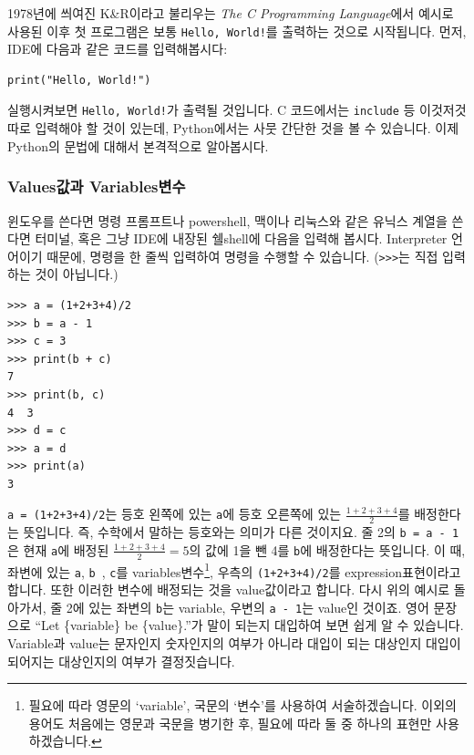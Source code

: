 \documentclass[../main.tex]{subfiles}
\begin{document}
1978년에 씌여진 K\&R이라고 불리우는 \textit{The C Programming Language}에서 예시로 사용된 이후 첫 프로그램은 보통 \texttt{Hello, World!}를 출력하는 것으로 시작됩니다.
먼저, IDE에 다음과 같은 코드를 입력해봅시다:
\begin{verbatim}
print("Hello, World!")
\end{verbatim}
실행시켜보면 \texttt{Hello, World!}가 출력될 것입니다.
C 코드에서는 \texttt{include} 등 이것저것 따로 입력해야 할 것이 있는데, Python에서는 사뭇 간단한 것을 볼 수 있습니다.
이제 Python의 문법에 대해서 본격적으로 알아봅시다.

\subsubsection{Values값과 Variables변수}
윈도우를 쓴다면 명령 프롬프트나 powershell, 맥이나 리눅스와 같은 유닉스 계열을 쓴다면 터미널, 혹은 그냥 IDE에 내장된 쉘shell에 다음을 입력해 봅시다.
Interpreter 언어이기 때문에, 명령을 한 줄씩 입력하여 명령을 수행할 수 있습니다.
(\texttt{>>>}는 직접 입력하는 것이 아닙니다.)
\begin{verbatim}
>>> a = (1+2+3+4)/2
>>> b = a - 1
>>> c = 3
>>> print(b + c)
7
>>> print(b, c)
4  3
>>> d = c
>>> a = d
>>> print(a)
3
\end{verbatim}
\texttt{a = (1+2+3+4)/2}는 등호 왼쪽에 있는 \texttt{a}에 등호 오른쪽에 있는 $\frac{1+2+3+4}{2}$를 배정한다는 뜻입니다.
즉, 수학에서 말하는 등호와는 의미가 다른 것이지요.
줄 2의 \texttt{b = a - 1}은 현재 \texttt{a}에 배정된 $\frac{1+2+3+4}{2} = 5$의 값에 1을 뺀 4를 \texttt{b}에 배정한다는 뜻입니다.
이 때, 좌변에 있는 \texttt{a}, \texttt{b	}, \texttt{c}를 variables변수\footnote{필요에 따라 영문의 `variable', 국문의 `변수'를 사용하여 서술하겠습니다. 이외의 용어도 처음에는 영문과 국문을 병기한 후, 필요에 따라 둘 중 하나의 표현만 사용하겠습니다.}, 우측의 \texttt{(1+2+3+4)/2}를 expression표현이라고 합니다.
또한 이러한 변수에 배정되는 것을 value값이라고 합니다.
다시 위의 예시로 돌아가서, 줄 2에 있는 좌변의 \texttt{b}는 variable, 우변의 \texttt{a - 1}는 value인 것이죠.
영어 문장으로 ``Let \{variable\} be \{value\}.''가 말이 되는지 대입하여 보면 쉽게 알 수 있습니다.
Variable과 value는 문자인지 숫자인지의 여부가 아니라 대입이 되는 대상인지 대입이 되어지는 대상인지의 여부가 결정짓습니다.
\end{document}
